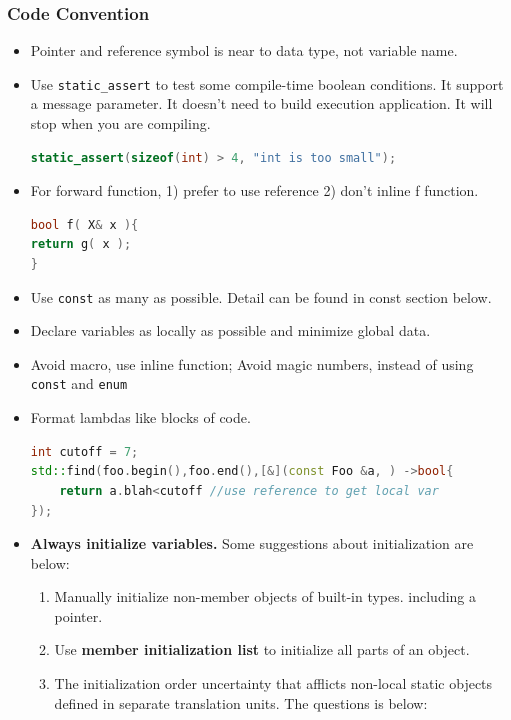 \documentclass[a4paper,12pt,twoside]{book}
\begin{document}
\subsubsection{Code Convention}
\begin{itemize}

\item Pointer and reference symbol is near to data type, not variable name.

\item Use \texttt{static\_assert} to test some compile-time boolean conditions. It support a message parameter. It doesn't need to build execution application. It will stop when you are compiling.
\begin{lstlisting}[frame=single, language=c++]
static_assert(sizeof(int) > 4, "int is too small");
\end{lstlisting}

\item For forward function, 1) prefer to use reference 2) don't inline f function.

\begin{lstlisting}[frame=single, language=c++]
bool f( X& x ){
return g( x );
}
\end{lstlisting}

\item Use \texttt{const} as many as possible. Detail can be found in const section below. 

\item Declare variables as locally as possible and minimize global data.

\item Avoid macro, use inline function;  Avoid magic numbers, instead of using \texttt{const} and \texttt{enum}

\item Format lambdas like blocks of code.
\begin{lstlisting}[frame=single, language=c++]
int cutoff = 7;
std::find(foo.begin(),foo.end(),[&](const Foo &a, ) ->bool{
    return a.blah<cutoff //use reference to get local var
});
\end{lstlisting}


\item \textbf{Always initialize variables.} Some suggestions about initialization are below:
\begin{enumerate}
\item Manually initialize non-member objects of built-in types. including a pointer.
\item Use \textbf{member initialization list} to initialize all parts of an object.
\item The initialization order uncertainty that afflicts non-local static objects defined in separate translation units. The questions is below:


\end{enumerate}
\end{itemize}
\end{document}
